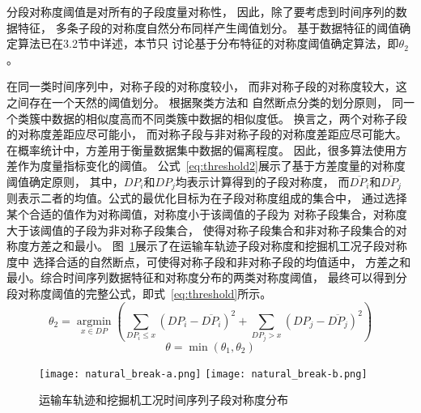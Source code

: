 分段对称度阈值是对所有的子段度量对称性，
因此，除了要考虑到时间序列的数据特征，
多条子段的对称度自然分布同样产生阈值划分。
基于数据特征的阈值确定算法已在3.2节中详述，本节只
讨论基于分布特征的对称度阈值确定算法，即$\theta_2$。

在同一类时间序列中，对称子段的对称度较小，
而非对称子段的对称度较大，这之间存在一个天然的阈值划分\cite{2022968}。
根据聚类方法\cite{DBLP:conf/kdd/EsterKSX96}和
自然断点分类的划分原则\cite{DBLP:journals/pami/Cheng95}，
同一个类簇中数据的相似度高而不同类簇中数据的相似度低。
换言之，两个对称子段的对称度差距应尽可能小，
而对称子段与非对称子段的对称度差距应尽可能大。
在概率统计中，方差用于衡量数据集中数据的偏离程度。
因此，很多算法使用方差作为度量指标变化的阈值\cite{DBLP:conf/sigmod/SongZW16}。
公式~\ref{eq:threshold2}展示了基于方差度量的对称度阈值确定原则，
其中，$DP_i$和$DP_j$均表示计算得到的子段对称度，
而$\overline{DP_{i}}$和$\overline{DP_{j}}$
则表示二者的均值。公式的最优化目标为在子段对称度组成的集合中，
通过选择某个合适的值作为对称阈值，对称度小于该阈值的子段为
对称子段集合，对称度大于该阈值的子段为非对称子段集合，
使得对称子段集合和非对称子段集合的对称度方差之和最小。
图~\ref{fig:natural_break}展示了在运输车轨迹子段对称度和挖掘机工况子段对称度中
选择合适的自然断点，可使得对称子段和非对称子段的均值适中，
方差之和最小。综合时间序列数据特征和对称度分布的两类对称度阈值，
最终可以得到分段对称度阈值的完整公式，即式~\ref{eq:threshold}所示。
\begin{equation}
  \theta_{2}=\underset{x \in D P}{\operatorname{argmin}}\left(\sum_{D P_{i} \leq x}\left(D P_{i}-\overline{D P_{i}}\right)^{2}+\sum_{D P_{j}>x}\left(D P_{j}-\overline{D P_{j}}\right)^{2}\right)
  \label{eq:threshold2}
\end{equation}
\begin{equation}
  \theta=\min \left(\theta_{1}, \theta_{2}\right)
  \label{eq:threshold}
\end{equation}
\begin{figure}
  \centering
  {\texttt{[image: natural\_break-a.png]}}
  {\texttt{[image: natural\_break-b.png]}}
  \caption{运输车轨迹和挖掘机工况时间序列子段对称度分布}
  \label{fig:natural_break}
\end{figure}

\renewcommand{\algorithmicrequire}{\textbf{输入：}\unskip}
\renewcommand{\algorithmicensure}{\textbf{输出：}\unskip}


